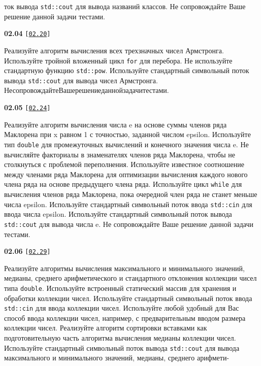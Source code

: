 \documentclass[a4paper,12pt]{article}
\begin{document}
ток вывода \lstinline{std::cout} для вывода названий классов. Не сопровождайте Ваше решение данной задачи тестами.

\bigskip

{\large \textbf{02.04} \texttt{[\href{https://github.com/i-s-m-mipt/Education/blob/master/projects/examples/source/02.20.cpp}{\texttt{02.20}}]}}

\bigskip

Реализуйте алгоритм вычисления всех трехзначных чисел Армстронга. Используйте тройной вложенный цикл \lstinline{for} для перебора. Не используйте стандартную функцию \lstinline{std::pow}. Используйте стандартный символьный поток вывода \lstinline{std::cout} для вывода чисел Армстронга. Не\:сопровождайте\:Ваше\:решение\:данной\:задачи\:тестами.

\bigskip

{\large \textbf{02.05} \texttt{[\href{https://github.com/i-s-m-mipt/Education/blob/master/projects/examples/source/02.24.cpp}{\texttt{02.24}}]}}

\bigskip

Реализуйте алгоритм вычисления числа e на основе суммы членов ряда Маклорена при x равном 1 с точностью, заданной числом epsilon. Используйте тип \lstinline{double} для промежуточных вычислений и конечного значения числа e. Не вычисляйте факториалы в знаменателях членов ряда Маклорена, чтобы не столкнуться с проблемой переполнения. Используйте известное соотношение между членами ряда Маклорена для оптимизации вычисления каждого нового члена ряда на основе предыдущего члена ряда. Используйте цикл \lstinline{while} для вычисления членов ряда Маклорена, пока очередной член ряда не станет меньше числа epsilon. Используйте стандартный символьный поток ввода \lstinline{std::cin} для ввода числа epsilon. Используйте стандартный символьный поток вывода \lstinline{std::cout} для вывода числа e. Не сопровождайте Ваше решение данной задачи тестами.

\bigskip

{\large \textbf{02.06} \texttt{[\href{https://github.com/i-s-m-mipt/Education/blob/master/projects/examples/source/02.29.cpp}{\texttt{02.29}}]}}

\bigskip

Реализуйте алгоритмы вычисления максимального и минимального значений, медианы, среднего арифметического и стандартного отклонения коллекции чисел типа \lstinline{double}. Используйте встроенный статический массив для хранения и обработки коллекции чисел. Используйте стандартный символьный поток ввода \lstinline{std::cin} для ввода коллекции чисел. Используйте любой удобный для Вас способ ввода коллекции чисел, например, с предварительным вводом размера коллекции чисел. Реализуйте алгоритм сортировки вставками как подготовительную часть алгоритма вычисления медианы коллекции чисел. Используйте стандартный символьный поток вывода \lstinline{std::cout} для вывода максимального и минимального значений, медианы, среднего арифмети- 
\end{document}
